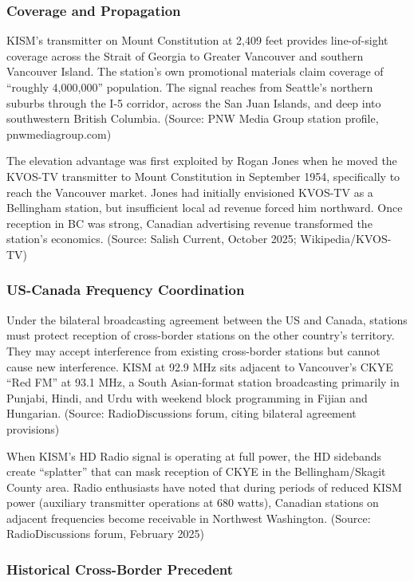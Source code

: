 \documentclass[11pt,letterpaper]{article}
\begin{document}
\subsubsection{Coverage and Propagation}

KISM's transmitter on Mount Constitution at 2,409 feet provides line-of-sight coverage across the Strait of Georgia to Greater Vancouver and southern Vancouver Island. The station's own promotional materials claim coverage of ``roughly 4,000,000'' population. The signal reaches from Seattle's northern suburbs through the I-5 corridor, across the San Juan Islands, and deep into southwestern British Columbia. (Source: PNW Media Group station profile, pnwmediagroup.com)

The elevation advantage was first exploited by Rogan Jones when he moved the KVOS-TV transmitter to Mount Constitution in September 1954, specifically to reach the Vancouver market. Jones had initially envisioned KVOS-TV as a Bellingham station, but insufficient local ad revenue forced him northward. Once reception in BC was strong, Canadian advertising revenue transformed the station's economics. (Source: Salish Current, October 2025; Wikipedia/KVOS-TV)

\subsubsection{US-Canada Frequency Coordination}

Under the bilateral broadcasting agreement between the US and Canada, stations must protect reception of cross-border stations on the other country's territory. They may accept interference from existing cross-border stations but cannot cause new interference. KISM at 92.9 MHz sits adjacent to Vancouver's CKYE ``Red FM'' at 93.1 MHz, a South Asian-format station broadcasting primarily in Punjabi, Hindi, and Urdu with weekend block programming in Fijian and Hungarian. (Source: RadioDiscussions forum, citing bilateral agreement provisions)

When KISM's HD Radio signal is operating at full power, the HD sidebands create ``splatter'' that can mask reception of CKYE in the Bellingham/Skagit County area. Radio enthusiasts have noted that during periods of reduced KISM power (auxiliary transmitter operations at 680 watts), Canadian stations on adjacent frequencies become receivable in Northwest Washington. (Source: RadioDiscussions forum, February 2025)

\subsubsection{Historical Cross-Border Precedent}
\end{document}
